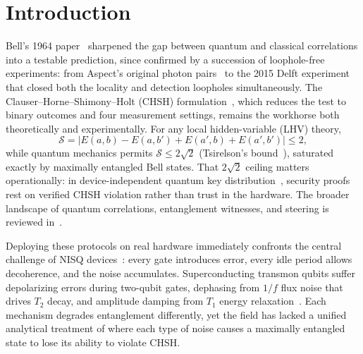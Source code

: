 \documentclass[12pt]{article}
\newcommand{\bigS}{\mathcal{S}}
\begin{document}
\newpage
\tableofcontents
\newpage

\section{Introduction}
\label{sec:intro}

Bell's 1964 paper~\cite{bell1964} sharpened the gap between quantum and classical correlations
into a testable prediction, since confirmed by a succession of loophole-free experiments: from Aspect's
original photon pairs~\cite{aspect1982} to the 2015 Delft experiment that closed both the locality
and detection loopholes simultaneously.
The Clauser--Horne--Shimony--Holt (CHSH) formulation~\cite{clauser1969}, which reduces the test
to binary outcomes and four measurement settings, remains the workhorse both theoretically and
experimentally.
For any local hidden-variable (LHV) theory,
\begin{equation}
  \bigS = |E(a,b) - E(a,b') + E(a',b) + E(a',b')| \leq 2,
  \label{eq:chsh_classical}
\end{equation}
while quantum mechanics permits $\bigS \leq 2\sqrt{2}$ (Tsirelson's bound~\cite{tsirelson1980}),
saturated exactly by maximally entangled Bell states.
That $2\sqrt{2}$ ceiling matters operationally: in device-independent quantum key
distribution~\cite{acin2007}, security proofs rest on verified CHSH violation rather than
trust in the hardware.
The broader landscape of quantum correlations, entanglement witnesses, and steering is reviewed
in~\cite{brunner2014, horodecki2009}.

Deploying these protocols on real hardware immediately confronts the central challenge of NISQ
devices~\cite{preskill2018nisq}: every gate introduces error, every idle period allows decoherence,
and the noise accumulates.
Superconducting transmon qubits suffer depolarizing errors during two-qubit gates, dephasing from
$1/f$ flux noise that drives $T_2$ decay, and amplitude damping from $T_1$ energy
relaxation~\cite{nielsen2000, bharti2022noisy}.
Each mechanism degrades entanglement differently, yet the field has lacked a unified analytical
treatment of where each type of noise causes a maximally entangled state to lose its ability to
violate CHSH.
\end{document}
